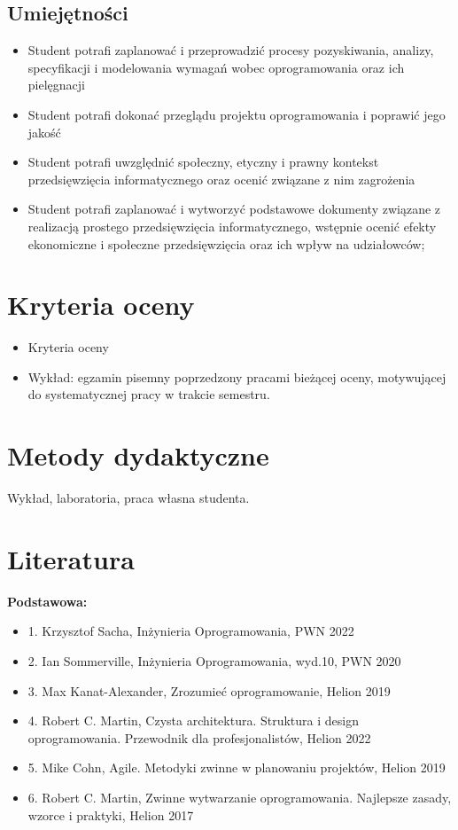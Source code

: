\documentclass[12pt, a4paper]{article}
\begin{document}
\subsection*{Umiejętności}
\begin{itemize}
  \item Student potrafi zaplanować i przeprowadzić procesy pozyskiwania, analizy, specyfikacji i modelowania wymagań wobec oprogramowania oraz ich pielęgnacji
  \item Student potrafi dokonać przeglądu projektu oprogramowania i poprawić jego jakość
  \item Student potrafi uwzględnić społeczny, etyczny i prawny kontekst przedsięwzięcia informatycznego oraz ocenić związane z nim zagrożenia
  \item Student potrafi zaplanować i wytworzyć podstawowe dokumenty związane z realizacją prostego przedsięwzięcia informatycznego, wstępnie ocenić efekty ekonomiczne i społeczne przedsięwzięcia oraz ich wpływ na udziałowców;
\end{itemize}

\section{Kryteria oceny}

\begin{itemize}
  \item Kryteria oceny
  \item Wykład: egzamin pisemny poprzedzony pracami bieżącej oceny, motywującej do systematycznej pracy w trakcie semestru.
\end{itemize}

\section{Metody dydaktyczne}

Wykład, laboratoria, praca własna studenta.

\section{Literatura}

\textbf{Podstawowa:}
\begin{itemize}
  \item 1. Krzysztof Sacha,  Inżynieria Oprogramowania, PWN 2022
  \item 2. Ian Sommerville,  Inżynieria Oprogramowania, wyd.10, PWN 2020
  \item 3. Max Kanat-Alexander, Zrozumieć oprogramowanie, Helion 2019
  \item 4. Robert C. Martin, Czysta architektura. Struktura i design oprogramowania. Przewodnik dla profesjonalistów, Helion 2022
  \item 5. Mike Cohn, Agile. Metodyki zwinne w planowaniu projektów, Helion 2019
  \item 6. Robert C. Martin, Zwinne wytwarzanie oprogramowania. Najlepsze zasady, wzorce i praktyki, Helion 2017
\end{itemize}
\end{document}
